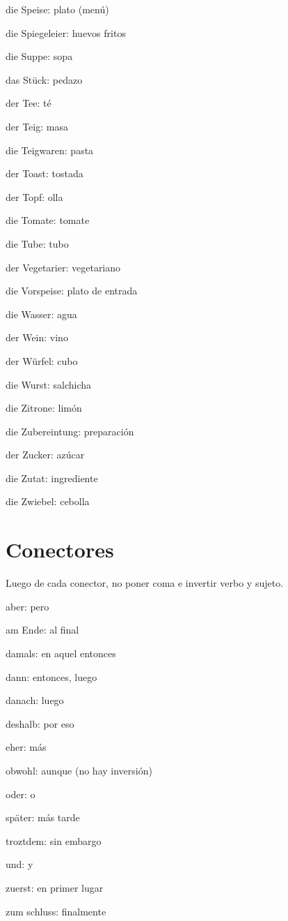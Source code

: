 \begin{multicols}{2}
\begin{myitemize}
\item die Speise: plato (menú)
\item die Spiegeleier: huevos fritos
\item die Suppe: sopa
\item das Stück: pedazo
\item der Tee: té
\item der Teig: masa
\item die Teigwaren: pasta
\item der Toast: tostada
\item der Topf: olla
\item die Tomate: tomate
\item die Tube: tubo
\item der Vegetarier: vegetariano
\item die Vorspeise: plato de entrada
\item die Wasser: agua
\item der Wein: vino
\item der Würfel: cubo
\item die Wurst: salchicha
\item die Zitrone: limón
\item die Zubereintung: preparación
\item der Zucker: azúcar
\item die Zutat: ingrediente
\item die Zwiebel: cebolla
\end{myitemize}
\end{multicols}

\section{Conectores}
Luego de cada conector, no poner coma e invertir verbo y sujeto.
\begin{multicols}{3}
\begin{myitemize}
\item aber: pero
\item am Ende: al final
\item damals: en aquel entonces
\item dann: entonces, luego
\item danach: luego
\item deshalb: por eso
\item eher: más
\item obwohl: aunque (no hay inversión)
\item oder: o
\item später: más tarde
\item troztdem: sin embargo
\item und: y
\item zuerst: en primer lugar
\item zum schluss: finalmente
\end{myitemize}
\end{multicols}


